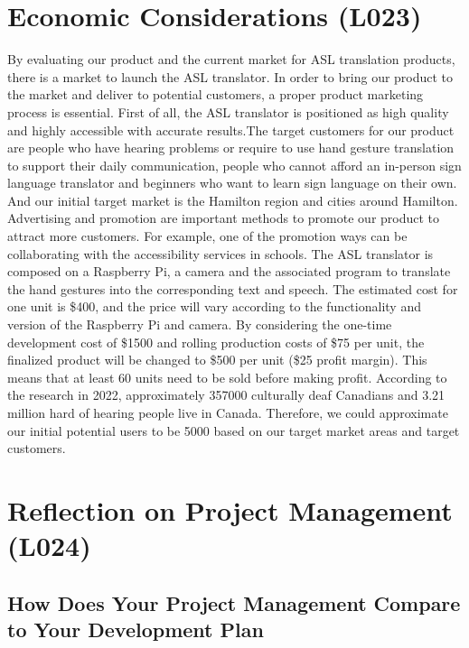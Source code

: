 \documentclass[12pt, titlepage]{article}
\begin{document}
\section{Economic Considerations (L023)}
By evaluating our product and the current market for ASL translation products, there is a market to launch the ASL translator. In order to bring our product to the market and deliver to potential customers, a proper product marketing process is essential. First of all, the ASL translator is positioned as high quality and highly accessible with accurate results.The target customers  for our product are people who have hearing problems or require to use hand gesture translation to support their daily communication, people who cannot afford an in-person sign language translator and beginners who want to learn sign language on their own. And our initial target market is the Hamilton region and cities around Hamilton. Advertising and promotion are important methods to promote our product to attract more customers. For example, one of the promotion ways can be collaborating with the accessibility services in schools. The ASL translator is composed on a Raspberry Pi, a camera and the associated program to translate the hand gestures into the corresponding text and speech. The estimated cost for one unit is \$400, and the price will vary according to the functionality and version of the Raspberry Pi and camera. By considering the one-time development cost of \$1500 and rolling production costs of \$75 per unit, the finalized product will be changed to \$500 per unit (\$25 profit margin). This means that at least 60 units need to be sold before making profit. According to the research in 2022, approximately 357000 culturally deaf Canadians and 3.21 million hard of hearing people live in Canada. Therefore, we could approximate our initial potential users to be 5000 based on our target market areas and target customers.\\

\section{Reflection on Project Management (L024)} 

\subsection{How Does Your Project Management Compare to Your Development Plan}
\end{document}

